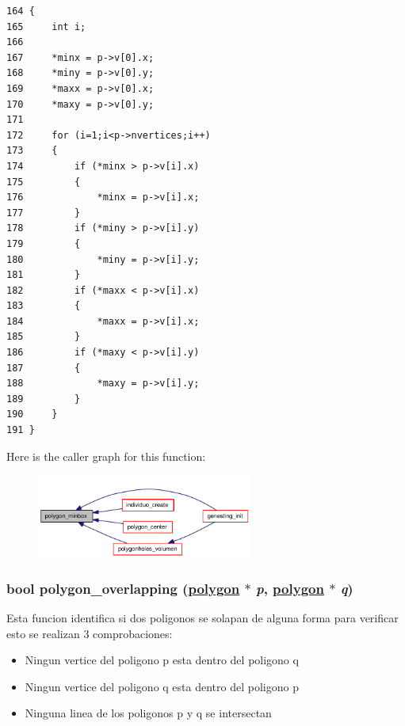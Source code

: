 \begin{Code}\begin{verbatim}164 {
165     int i;
166 
167     *minx = p->v[0].x;
168     *miny = p->v[0].y;
169     *maxx = p->v[0].x;
170     *maxy = p->v[0].y;
171 
172     for (i=1;i<p->nvertices;i++)
173     {
174         if (*minx > p->v[i].x)
175         {
176             *minx = p->v[i].x;
177         }
178         if (*miny > p->v[i].y)
179         {
180             *miny = p->v[i].y;
181         }
182         if (*maxx < p->v[i].x)
183         {
184             *maxx = p->v[i].x;
185         }
186         if (*maxy < p->v[i].y)
187         {
188             *maxy = p->v[i].y;
189         }
190     }
191 }
\end{verbatim}\end{Code}




Here is the caller graph for this function:\begin{figure}[H]
\begin{center}
\leavevmode
\includegraphics[width=201pt]{group__geometry_g137ef6f552a0a04c5ae0493690088f3f_g137ef6f552a0a04c5ae0493690088f3f_icgraph}
\end{center}
\end{figure}
\hypertarget{group__geometry_g2be6101a257ea8896e61e93d14b22b89_g2be6101a257ea8896e61e93d14b22b89}{
\subsubsection[polygon\_\-overlapping]{\setlength{\rightskip}{0pt plus 5cm}bool polygon\_\-overlapping (\hyperlink{struct__polygon}{polygon} $\ast$ {\em p}, \hyperlink{struct__polygon}{polygon} $\ast$ {\em q})}}
\label{group__geometry_g2be6101a257ea8896e61e93d14b22b89_g2be6101a257ea8896e61e93d14b22b89}


Esta funcion identifica si dos poligonos se solapan de alguna forma para verificar esto se realizan 3 comprobaciones:\begin{itemize}
\item Ningun vertice del poligono p esta dentro del poligono q\item Ningun vertice del poligono q esta dentro del poligono p\item Ninguna linea de los poligonos p y q se intersectan\end{itemize}


